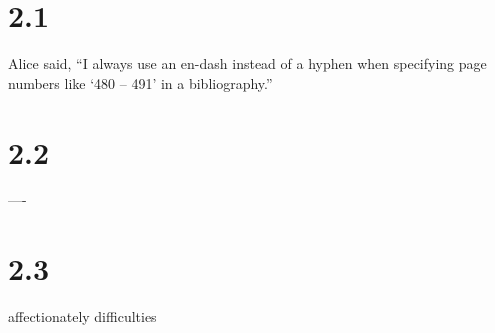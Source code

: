 \documentclass{article}
\begin{document}
\section*{2.1}
Alice said, ``I always use an en-dash instead of a hyphen when specifying page numbers
like `480 -- 491' in a bibliography.''

\section*{2.2}
----

\section*{2.3}
affectionately
difficulties
\end{document}
